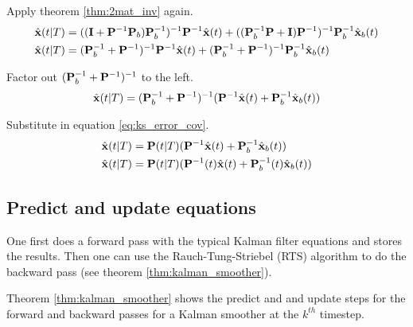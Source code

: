 Apply theorem \ref{thm:2mat_inv} again.
\begin{align*}
  \hat{\mathbf{x}}(t|T) &=
    ((\mathbf{I} + \mathbf{P}^{-1}\mathbf{P}_b)\mathbf{P}_b^{-1})^{-1}
      \mathbf{P}^{-1}\hat{\mathbf{x}}(t) +
    ((\mathbf{P}_b^{-1}\mathbf{P} + \mathbf{I})\mathbf{P}^{-1})^{-1}
      \mathbf{P}_b^{-1}\hat{\mathbf{x}}_b(t) \\
  \hat{\mathbf{x}}(t|T) &=
    (\mathbf{P}_b^{-1} + \mathbf{P}^{-1})^{-1}\mathbf{P}^{-1}\hat{\mathbf{x}}(t) +
    (\mathbf{P}_b^{-1} + \mathbf{P}^{-1})^{-1}\mathbf{P}_b^{-1}\hat{\mathbf{x}}_b(t)
\end{align*}

Factor out $(\mathbf{P}_b^{-1} + \mathbf{P}^{-1})^{-1}$ to the left.
\begin{equation*}
  \hat{\mathbf{x}}(t|T) =
    (\mathbf{P}_b^{-1} + \mathbf{P}^{-1})^{-1}
    (\mathbf{P}^{-1}\hat{\mathbf{x}}(t) + \mathbf{P}_b^{-1}\hat{\mathbf{x}}_b(t))
\end{equation*}

Substitute in equation \eqref{eq:ks_error_cov}.
\begin{align}
  \hat{\mathbf{x}}(t|T) &= \mathbf{P}(t|T)
    (\mathbf{P}^{-1}\hat{\mathbf{x}}(t) + \mathbf{P}_b^{-1}\hat{\mathbf{x}}_b(t)) \nonumber
    \\
  \hat{\mathbf{x}}(t|T) &= \mathbf{P}(t|T)
    (\mathbf{P}^{-1}(t)\hat{\mathbf{x}}(t) + \mathbf{P}_b^{-1}(t)\hat{\mathbf{x}}_b(t))
\end{align}

\subsection{Predict and update equations}

One first does a forward pass with the typical Kalman filter equations and
stores the results. Then one can use the Rauch-Tung-Striebel (RTS) algorithm to
do the backward pass (see theorem \ref{thm:kalman_smoother}).

Theorem \ref{thm:kalman_smoother} shows the predict and and update steps for the
forward and backward passes for a Kalman smoother at the $k^{th}$ timestep.

